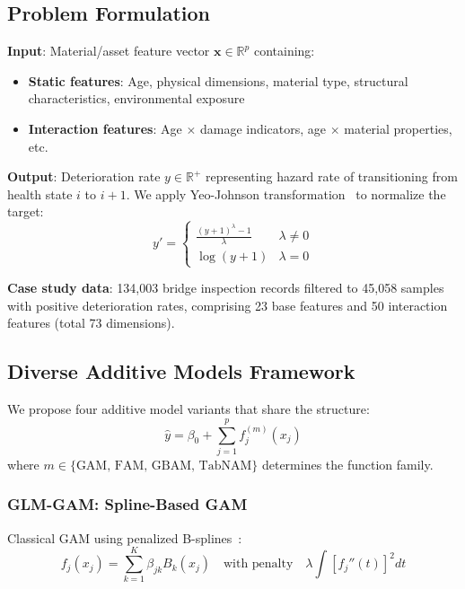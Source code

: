 \documentclass[twocolumn]{article}
\begin{document}
\subsection{Problem Formulation}

\textbf{Input}: Material/asset feature vector $\mathbf{x} \in \mathbb{R}^{p}$ containing:
\begin{itemize}
\item \textbf{Static features}: Age, physical dimensions, material type, structural characteristics, environmental exposure
\item \textbf{Interaction features}: Age $\times$ damage indicators, age $\times$ material properties, etc.
\end{itemize}

\textbf{Output}: Deterioration rate $y \in \mathbb{R}^+$ representing hazard rate of transitioning from health state $i$ to $i+1$. We apply Yeo-Johnson transformation~\cite{yeo2000yj} to normalize the target:
\begin{equation}
y' = \begin{cases}
\frac{(y+1)^\lambda - 1}{\lambda} & \lambda \neq 0 \\
\log(y+1) & \lambda = 0
\end{cases}
\end{equation}

\textbf{Case study data}: 134,003 bridge inspection records filtered to 45,058 samples with positive deterioration rates, comprising 23 base features and 50 interaction features (total 73 dimensions).

\subsection{Diverse Additive Models Framework}

We propose four additive model variants that share the structure:
\begin{equation}
\hat{y} = \beta_0 + \sum_{j=1}^{p} f_j^{(m)}(x_j)
\end{equation}
where $m \in \{\text{GAM, FAM, GBAM, TabNAM}\}$ determines the function family.

\subsubsection{GLM-GAM: Spline-Based GAM}

Classical GAM using penalized B-splines~\cite{eilers1996flexible}:
\begin{equation}
f_j(x_j) = \sum_{k=1}^{K} \beta_{jk} B_k(x_j) \quad \text{with penalty} \quad \lambda \int [f_j''(t)]^2 dt
\end{equation}
\end{document}
